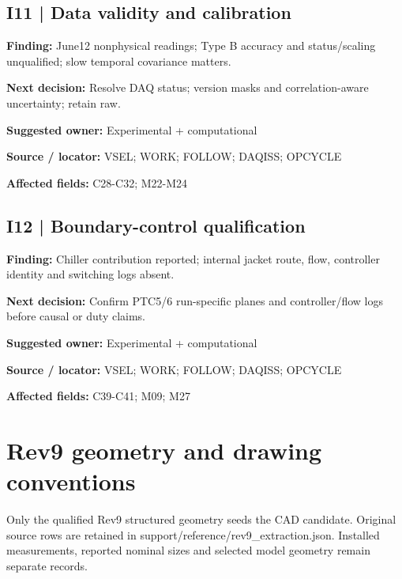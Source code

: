 \documentclass[11pt]{article}
\begin{document}
\par\noindent\begin{minipage}{\textwidth}\small\setlength{\parskip}{2pt}
\subsection*{I11 | Data validity and calibration}
\textbf{Finding:} June12 nonphysical readings; Type B accuracy and status/scaling unqualified; slow temporal covariance matters.\par
\textbf{Next decision:} Resolve DAQ status; version masks and correlation-aware uncertainty; retain raw.\par
\textbf{Suggested owner:} Experimental + computational\par
\textbf{Source / locator:} VSEL; WORK; FOLLOW; DAQISS; OPCYCLE\par
\textbf{Affected fields:} C28-C32; M22-M24\par
\end{minipage}\par\vspace{8pt}
\par\noindent\begin{minipage}{\textwidth}\small\setlength{\parskip}{2pt}
\subsection*{I12 | Boundary-control qualification}
\textbf{Finding:} Chiller contribution reported; internal jacket route, flow, controller identity and switching logs absent.\par
\textbf{Next decision:} Confirm PTC5/6 run-specific planes and controller/flow logs before causal or duty claims.\par
\textbf{Suggested owner:} Experimental + computational\par
\textbf{Source / locator:} VSEL; WORK; FOLLOW; DAQISS; OPCYCLE\par
\textbf{Affected fields:} C39-C41; M09; M27\par
\end{minipage}\par\vspace{8pt}
\clearpage\section{Rev9 geometry and drawing conventions}\label{geometry-detail}
Only the qualified Rev9 structured geometry seeds the CAD candidate. Original source rows are retained in support/reference/rev9\_extraction.json. Installed measurements, reported nominal sizes and selected model geometry remain separate records.
\end{document}
